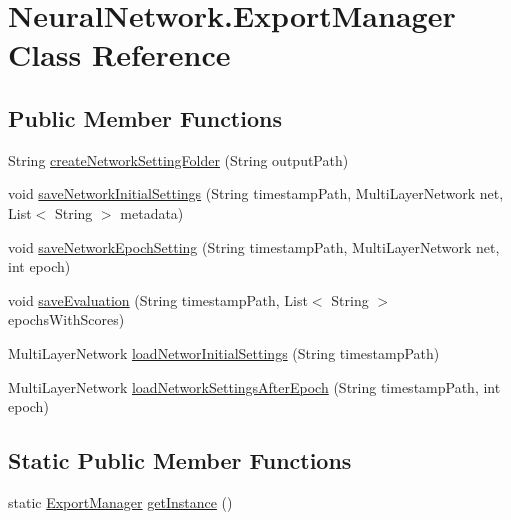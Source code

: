 \hypertarget{class_neural_network_1_1_export_manager}{}\section{Neural\+Network.\+Export\+Manager Class Reference}
\label{class_neural_network_1_1_export_manager}
\subsection*{Public Member Functions}
\begin{DoxyCompactItemize}
\item 
String \hyperlink{class_neural_network_1_1_export_manager_a682b8d0267d006c5e1c149a09fdd20a7}{create\+Network\+Setting\+Folder} (String output\+Path)
\item 
void \hyperlink{class_neural_network_1_1_export_manager_a83f29a395f51f0b21ca3a092917b5dbc}{save\+Network\+Initial\+Settings} (String timestamp\+Path, Multi\+Layer\+Network net, List$<$ String $>$ metadata)
\item 
void \hyperlink{class_neural_network_1_1_export_manager_ab7753bc20aeee9b9bae9876e54cf3499}{save\+Network\+Epoch\+Setting} (String timestamp\+Path, Multi\+Layer\+Network net, int epoch)
\item 
void \hyperlink{class_neural_network_1_1_export_manager_ae962981da22f49058ad6c1ebe8a3f2ac}{save\+Evaluation} (String timestamp\+Path, List$<$ String $>$ epochs\+With\+Scores)
\item 
Multi\+Layer\+Network \hyperlink{class_neural_network_1_1_export_manager_ab52eaee01d618d77fd5f4d48e98a77a0}{load\+Networ\+Initial\+Settings} (String timestamp\+Path)
\item 
Multi\+Layer\+Network \hyperlink{class_neural_network_1_1_export_manager_a4309073b42021506bef9d60ac1a57b4b}{load\+Network\+Settings\+After\+Epoch} (String timestamp\+Path, int epoch)
\end{DoxyCompactItemize}
\subsection*{Static Public Member Functions}
\begin{DoxyCompactItemize}
\item 
static \hyperlink{class_neural_network_1_1_export_manager}{Export\+Manager} \hyperlink{class_neural_network_1_1_export_manager_a0cde5bd623fcaba7372e271388f1d554}{get\+Instance} ()
\end{DoxyCompactItemize}


